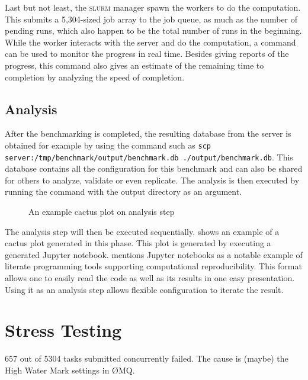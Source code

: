Last but not least, the \textsc{slurm} manager spawn the workers to do the computation.
This submits a 5,304-sized job array to the job queue, as much as the number of pending runs, which also happen to be the total number of runs in the beginning.
While the worker interacts with the server and do the computation, a  command can be used to monitor the progress in real time.
Besides giving reports of the progress, this command also gives an estimate of the remaining time to completion by analyzing the speed of completion.

\subsection{Analysis}

After the benchmarking is completed, the resulting database from the server is obtained for example by using the  command such as \texttt{scp server:/tmp/benchmark/output/benchmark.db ./output/benchmark.db}.
This database contains all the configuration for this benchmark and can also be shared for others to analyze, validate or even replicate.
The analysis is then executed by running the  command with the output directory as an argument.

\begin{figure}
	\centering
	\caption{An example cactus plot on analysis step}
	\label{fig:eval.cactus}
\end{figure}

The analysis step will then be executed sequentially.
 shows an example of a cactus plot generated in this phase.
This plot is generated by executing a generated Jupyter notebook.
\citet{piccoloToolsTechniquesComputational2016} mentions Jupyter notebooks as a notable example of literate programming tools supporting computational reproducibility.
This format allows one to easily read the code as well as its results in one easy presentation.
Using it as an analysis step allows flexible configuration to iterate the result.


\section{Stress Testing}

657 out of 5304 tasks submitted concurrently failed.
The cause is (maybe) the High Water Mark settings in \O MQ.


